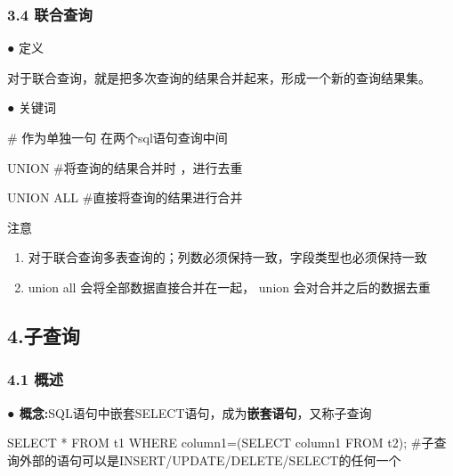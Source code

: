 \documentclass[
  letterpaper,
  DIV=11,
  numbers=noendperiod]{scrreprt}
\newenvironment{Shaded}{\begin{snugshade}}{\end{snugshade}}
\newcommand{\KeywordTok}[1]{\textcolor[rgb]{0.00,0.23,0.31}{#1}}
\newcommand{\NormalTok}[1]{\textcolor[rgb]{0.00,0.23,0.31}{#1}}
\newcommand{\OperatorTok}[1]{\textcolor[rgb]{0.37,0.37,0.37}{#1}}
\providecommand{\tightlist}{%
  \setlength{\itemsep}{0pt}\setlength{\parskip}{0pt}}\usepackage{longtable,booktabs,array}
\begin{document}
\hypertarget{ux8054ux5408ux67e5ux8be2}{%
\subsubsection{\texorpdfstring{\textbf{3.4}
\textbf{联合查询}}{3.4 联合查询}}\label{ux8054ux5408ux67e5ux8be2}}

\hspace{0pt} ● 定义

对于联合查询，就是把多次查询的结果合并起来，形成一个新的查询结果集。

\hspace{0pt} ● 关键词

\begin{Shaded}
\begin{Highlighting}[]
\NormalTok{\# 作为单独一句 在两个sql语句查询中间}

\KeywordTok{UNION}\NormalTok{ \#将查询的结果合并时 ，进行去重}

\KeywordTok{UNION} \KeywordTok{ALL}\NormalTok{ \#直接将查询的结果进行合并}
\end{Highlighting}
\end{Shaded}

注意

\begin{enumerate}
\def\labelenumi{\arabic{enumi}.}
\tightlist
\item
  对于联合查询多表查询的；列数必须保持一致，字段类型也必须保持一致
\item
  union all 会将全部数据直接合并在一起， union 会对合并之后的数据去重
\end{enumerate}

\hypertarget{ux5b50ux67e5ux8be2}{%
\subsection{4.子查询}\label{ux5b50ux67e5ux8be2}}

\hypertarget{ux6982ux8ff0}{%
\subsubsection{\texorpdfstring{\textbf{4.1}
\textbf{概述}}{4.1 概述}}\label{ux6982ux8ff0}}

\hspace{0pt} \textbf{●
概念:}SQL语句中嵌套SELECT语句，成为\textbf{嵌套语句}，又称子查询

\begin{Shaded}
\begin{Highlighting}[]
\KeywordTok{SELECT} \OperatorTok{*} \KeywordTok{FROM}\NormalTok{ t1 }\KeywordTok{WHERE}\NormalTok{ column1}\OperatorTok{=}\NormalTok{(}\KeywordTok{SELECT}\NormalTok{ column1 }\KeywordTok{FROM}\NormalTok{ t2);}
\NormalTok{\#子查询外部的语句可以是INSERT}\OperatorTok{/}\KeywordTok{UPDATE}\OperatorTok{/}\KeywordTok{DELETE}\OperatorTok{/}\NormalTok{SELECT的任何一个}
\end{Highlighting}
\end{Shaded}
\end{document}
